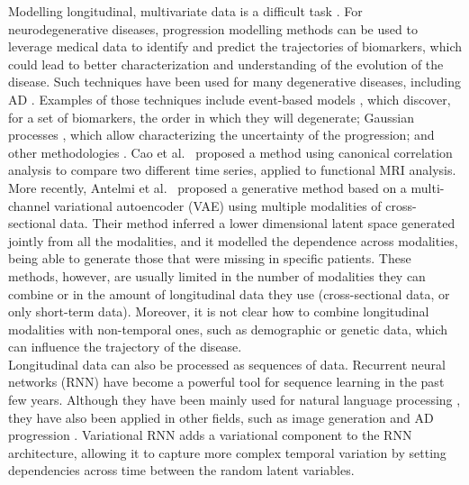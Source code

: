 Modelling longitudinal, multivariate data is a difficult task \cite{Verbeke2014}. For neurodegenerative diseases, progression modelling methods can be used to leverage medical data to identify and predict the trajectories of biomarkers, which could lead to better characterization and understanding of the evolution of the disease. Such techniques have been used for many degenerative diseases, including AD \cite{Oxtoby2017,Marti-Juan2020,Lei2020,Fisher2019}. Examples of those techniques include event-based models \cite{Young2014,Young2015a,Fonteijn2012}, which discover, for a set of biomarkers, the order in which they will degenerate; Gaussian processes \cite{Lorenzi2015b,Hyun2016,Lorenzi2019}, which allow characterizing the uncertainty of the progression; and other methodologies \cite{Marinescu2019, Young2017}. Cao et al.\ \cite{Cao2019} proposed a method using canonical correlation analysis to compare two different time series, applied to functional MRI analysis. More recently, Antelmi et al.\ \cite{Antelmi2019} proposed a generative method based on a multi-channel variational autoencoder (VAE) using multiple modalities of cross-sectional data. Their method inferred a lower dimensional latent space generated jointly from all the modalities, and it modelled the dependence across modalities, being able to generate those that were missing in specific patients. These methods, however, are usually limited in the number of modalities they can combine or in the amount of longitudinal data they use (cross-sectional data, or only short-term data). Moreover, it is not clear how to combine longitudinal modalities with non-temporal ones, such as demographic or genetic data, which can influence the trajectory of the disease. \\

Longitudinal data can also be processed as sequences of data. Recurrent neural networks (RNN) \cite{Hochreiter1997} have become a powerful tool for sequence learning in the past few years. Although they have been mainly used for natural language processing \cite{Goldberg2017}, they have also been applied in other fields, such as image generation \cite{Gregor2015a} and AD progression \cite{Wang2018,Ghazi2019}. Variational RNN \cite{Chung2015,Fabius2015} adds a variational component to the RNN architecture, allowing it to capture more complex temporal variation by setting dependencies across time between the random latent variables. \\ 


